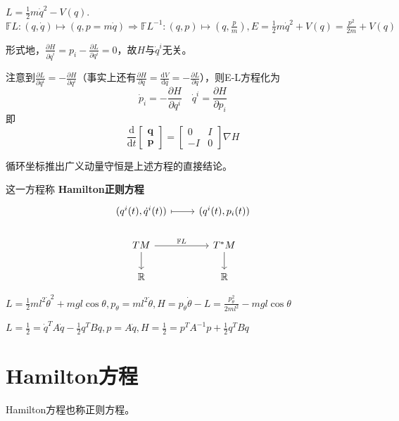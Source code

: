 \documentclass{ctexbook}
\begin{document}
\begin{Eg}[一维系统]
$L=\frac{1}{2}m \dot{q}^2-V(q)$. $\mathbb{F}L: (q, \dot{q})\mapsto (q, p=m \dot{q})\Rightarrow \mathbb{F}L^{-1}:(q,p)\mapsto (q, \frac{p}{m}), E=\frac{1}{2}m \dot{q}^2+V(q)=\frac{p^2}{2m}+V(q)$
\end{Eg}

形式地，$\frac{\partial H}{\partial \dot{q}^{i}}=p_i-\frac{\partial L}{\partial q^{i}}=0$，故$H$与$\dot{q}^i$无关。


注意到$\frac{\partial L}{\partial q^{i}}=-\frac{\partial H}{\partial q^{i}}$（事实上还有$\frac{\partial H}{\partial q}=\frac{\mathrm{d}V}{\mathrm{d}q}=-\frac{\partial L}{\partial q}$），则E-L方程化为
\begin{equation*}
\dot{p}_i=-\frac{\partial H}{\partial q^{i}} \quad \dot{q}^i=\frac{\partial H}{\partial p_{i}}
\end{equation*}
即
\begin{equation*}
\frac{\mathrm{d}}{\mathrm{d}t}
\begin{bmatrix}
  \bm{q}\\ \bm{p}
\end{bmatrix}=
\begin{bmatrix}
  0& I\\ -I& 0
\end{bmatrix}
\nabla H
\end{equation*}

循环坐标推出广义动量守恒是上述方程的直接结论。

这一方程称 \textbf{Hamilton正则方程}
\[
\begin{tikzcd}
{(q^i(t),\dot{q}^i(t))} \arrow[r, maps to] & {(q^i(t), p_i(t))} \\
TM \arrow[d] \arrow[r, "\mathbb{F}L"]      & T^*M \arrow[d]     \\
\mathbb{R}                                 & \mathbb{R}        
\end{tikzcd}
\]

\begin{Eg}[单摆]
  $L=\frac{1}{2}ml^2\dot{\theta}^2+mgl\cos\theta, p_{\theta}=ml^2\dot{\theta}, H=p_{\theta}\dot{\theta}-L=\frac{p_\theta^2}{2ml^2}-mgl\cos\theta$
\end{Eg}

\begin{Eg}[线性系统]
  $L=\frac{1}{2}=\dot{q}^TA \dot{q}-\frac{1}{2}q^TBq, p=A\dot{q}, H=\frac{1}{2}=p^TA^{-1}p+\frac{1}{2}q^TBq$
\end{Eg}

\section{Hamilton方程}
Hamilton方程也称正则方程。
\end{document}
